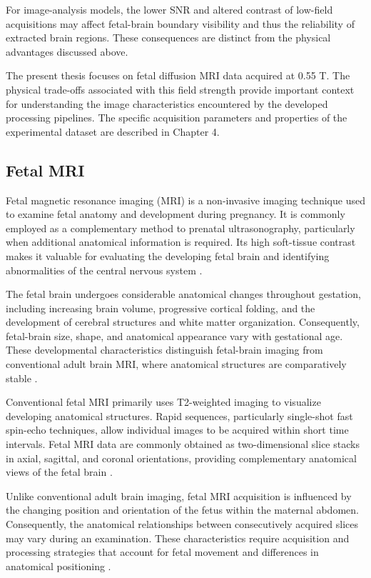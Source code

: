 For image-analysis models, the lower SNR and altered contrast of low-field acquisitions may affect fetal-brain boundary visibility and thus the reliability of extracted brain regions. These consequences are distinct from the physical advantages discussed above.

The present thesis focuses on fetal diffusion MRI data acquired at 0.55 T. The physical trade-offs associated with this field strength provide important context for understanding the image characteristics encountered by the developed processing pipelines. The specific acquisition parameters and properties of the experimental dataset are described in Chapter 4.

\subsection{Fetal MRI}

Fetal magnetic resonance imaging (MRI) is a non-invasive imaging technique used to examine fetal anatomy and development during pregnancy. It is commonly employed as a complementary method to prenatal ultrasonography, particularly when additional anatomical information is required. Its high soft-tissue contrast makes it valuable for evaluating the developing fetal brain and identifying abnormalities of the central nervous system \autocite{isuog2023fetalmri,malamateniou2013motion}.

The fetal brain undergoes considerable anatomical changes throughout gestation, including increasing brain volume, progressive cortical folding, and the development of cerebral structures and white matter organization. Consequently, fetal-brain size, shape, and anatomical appearance vary with gestational age. These developmental characteristics distinguish fetal-brain imaging from conventional adult brain MRI, where anatomical structures are comparatively stable \autocite{malamateniou2013motion}.

Conventional fetal MRI primarily uses T2-weighted imaging to visualize developing anatomical structures. Rapid sequences, particularly single-shot fast spin-echo techniques, allow individual images to be acquired within short time intervals. Fetal MRI data are commonly obtained as two-dimensional slice stacks in axial, sagittal, and coronal orientations, providing complementary anatomical views of the fetal brain \autocite{isuog2023fetalmri}.

Unlike conventional adult brain imaging, fetal MRI acquisition is influenced by the changing position and orientation of the fetus within the maternal abdomen. Consequently, the anatomical relationships between consecutively acquired slices may vary during an examination. These characteristics require acquisition and processing strategies that account for fetal movement and differences in anatomical positioning \autocite{malamateniou2013motion}.

